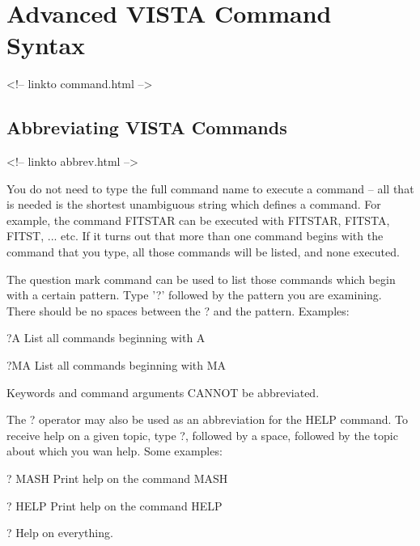 \chapter{Advanced VISTA Command Syntax}
\begin{rawhtml}
<!-- linkto command.html -->
\end{rawhtml}

%
%

\section{Abbreviating VISTA Commands}
\begin{rawhtml}
<!-- linkto abbrev.html -->
\end{rawhtml}

You do not need to type the full command name to execute a command -- all
that is needed is the shortest unambiguous string which defines a command.
For example, the command FITSTAR can be executed with FITSTAR, FITSTA,
FITST, ... etc.  If it turns out that more than one command begins with the
command that you type, all those commands will be listed, and none
executed.

The question mark command can be used to list those commands which begin
with a certain pattern.  Type '?' followed by the pattern you are
examining.  There should be no spaces between the ? and the pattern.
Examples:

\begin{example}
  \item[?A\hfill]{List all commands beginning with A}
  \item[?MA\hfill]{List all commands beginning with MA}
\end{example}

Keywords and command arguments CANNOT be abbreviated.

The ? operator may also be used as an abbreviation for the HELP command.
To receive help on a given topic, type ?, followed by a space, followed by
the topic about which you wan help.  Some examples:

\begin{example}
  \item[? MASH\hfill]{Print help on the command MASH}
  \item[? HELP\hfill]{Print help on the command HELP}
  \item[?\hfill]{Help on everything.}
\end{example}

